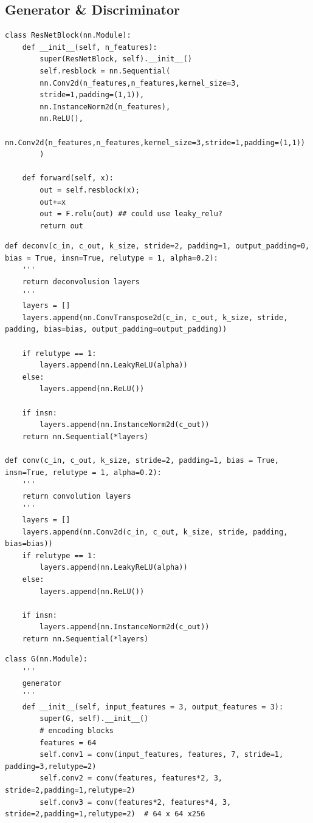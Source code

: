 \documentclass[runningheads]{llncs}
\begin{document}
\begin{subappendices}
	\renewcommand{\thesection}{\Alph{section}}%
	
	\section{Generator \& Discriminator}
\begin{lstlisting} 
class ResNetBlock(nn.Module):
	def __init__(self, n_features):
		super(ResNetBlock, self).__init__()
		self.resblock = nn.Sequential(
		nn.Conv2d(n_features,n_features,kernel_size=3,
		stride=1,padding=(1,1)),
		nn.InstanceNorm2d(n_features),
		nn.ReLU(),
		nn.Conv2d(n_features,n_features,kernel_size=3,stride=1,padding=(1,1))
		)

	def forward(self, x):
		out = self.resblock(x);
		out+=x
		out = F.relu(out) ## could use leaky_relu?
		return out
\end{lstlisting}

\begin{lstlisting} 
def deconv(c_in, c_out, k_size, stride=2, padding=1, output_padding=0, bias = True, insn=True, relutype = 1, alpha=0.2):
	'''
	return deconvolusion layers
	'''
	layers = []
	layers.append(nn.ConvTranspose2d(c_in, c_out, k_size, stride, padding, bias=bias, output_padding=output_padding))

	if relutype == 1:
		layers.append(nn.LeakyReLU(alpha))
	else:
		layers.append(nn.ReLU())
	
	if insn:
		layers.append(nn.InstanceNorm2d(c_out))
	return nn.Sequential(*layers)

def conv(c_in, c_out, k_size, stride=2, padding=1, bias = True, insn=True, relutype = 1, alpha=0.2):
	'''
	return convolution layers
	'''    
	layers = []
	layers.append(nn.Conv2d(c_in, c_out, k_size, stride, padding, bias=bias))
	if relutype == 1:
		layers.append(nn.LeakyReLU(alpha))
	else:
		layers.append(nn.ReLU())

	if insn:
		layers.append(nn.InstanceNorm2d(c_out))
	return nn.Sequential(*layers)
\end{lstlisting}

\begin{lstlisting} 
class G(nn.Module):
	'''
	generator
	'''
	def __init__(self, input_features = 3, output_features = 3):
		super(G, self).__init__()
		# encoding blocks
		features = 64
		self.conv1 = conv(input_features, features, 7, stride=1, padding=3,relutype=2)
		self.conv2 = conv(features, features*2, 3, stride=2,padding=1,relutype=2)
		self.conv3 = conv(features*2, features*4, 3, stride=2,padding=1,relutype=2)  # 64 x 64 x256
		

\end{lstlisting}
\end{subappendices}
\end{document}
